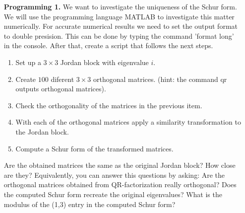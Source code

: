 \documentclass[14pt]{report}
\begin{document}
\begin{enumerate}
  \item[\textbf{Programming 1.}] We want to investigate the uniqueness
    of the Schur form. We will use the programming language MATLAB to 
    investigate this matter numerically. For accurate numerical results we 
    need to set the output format to double presision. This can be done by
    typing the command 'format long' in the console. After that, create a
    script that follows the next steps.
    \begin{enumerate}
      \item Set up a $3\times3$ Jordan block with eigenvalue $i$.
      \item Create $100$ diferent $3\times3$ orthogonal matrices. (hint: the
        command qr outputs orthogonal matrices).
      \item Check the orthogonality of the  matrices in the previous item.
      \item With each of the orthogonal matrices apply a similarity
        transformation to the Jordan block.
      \item Compute a Schur form of the transformed matrices.
    \end{enumerate}
    Are the obtained matrices the same as the original Jordan block? How
    close are they? Equivalently, you can answer this questions by asking: 
    Are the orthogonal matrices obtained from QR-factorization really
    orthogonal? Does the computed Schur form recreate the original eigenvalues?
    What is the modulus of the (1,3) entry in the computed Schur form?

  \end{enumerate}
\end{document}
